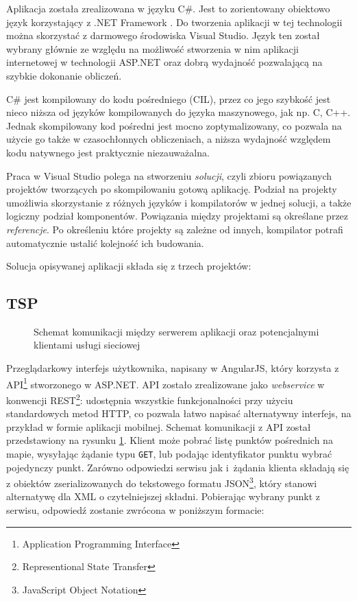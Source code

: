 Aplikacja została zrealizowana w języku C\#. Jest to zorientowany obiektowo język korzystający z .NET Framework \cite{csharp}. Do tworzenia aplikacji w tej technologii można skorzystać z darmowego środowiska Visual Studio. Język ten został wybrany głównie ze względu na możliwość stworzenia w nim aplikacji internetowej w technologii ASP.NET oraz dobrą wydajność pozwalającą na szybkie dokonanie obliczeń. 

C\# jest kompilowany do kodu pośredniego (CIL), przez co jego szybkość jest nieco niższa od języków kompilowanych do języka maszynowego, jak np. C, C++. Jednak skompilowany kod pośredni jest mocno zoptymalizowany, co pozwala na użycie go także w czasochłonnych obliczeniach, a niższa wydajność względem kodu natywnego jest praktycznie niezauważalna.

Praca w Visual Studio polega na stworzeniu \textit{solucji}, czyli zbioru powiązanych projektów tworzących po skompilowaniu gotową aplikację. Podział na projekty umożliwia skorzystanie z różnych języków i kompilatorów w jednej solucji, a także logiczny podział komponentów. Powiązania między projektami są określane przez \textit{referencje}. Po określeniu które projekty są zależne od innych, kompilator potrafi automatycznie ustalić kolejność ich budowania.

Solucja opisywanej aplikacji składa się z trzech projektów:

\subsection*{TSP} 

\begin{figure}
	\centering
	\def\svgwidth{\columnwidth}
	
	\caption{Schemat komunikacji między serwerem aplikacji oraz potencjalnymi klientami usługi sieciowej}
	\label{fig:rest_api}
\end{figure}

Przeglądarkowy interfejs użytkownika, napisany w AngularJS, który korzysta z API\footnote{Application Programming Interface} stworzonego w ASP.NET. API zostało zrealizowane jako \textit{webservice} w konwencji REST\footnote{Representional State Transfer}: udostępnia wszystkie funkcjonalności przy użyciu standardowych metod HTTP, co pozwala łatwo napisać alternatywny interfejs, na przykład w formie aplikacji mobilnej. Schemat komunikacji z API został przedstawiony na rysunku \ref{fig:rest_api}. Klient może pobrać listę punktów pośrednich na mapie, wysyłając żądanie typu \texttt{GET}, lub podając identyfikator punktu wybrać pojedynczy punkt. Zarówno odpowiedzi serwisu jak i~żądania klienta składają się z obiektów zserializowanych do tekstowego formatu JSON\footnote{JavaScript Object Notation}, który stanowi alternatywę dla XML o czytelniejszej składni. Pobierając wybrany punkt z serwisu, odpowiedź zostanie zwrócona w poniższym formacie:

